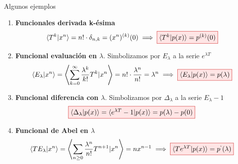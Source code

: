 \documentclass{beamer}
\newcommand{\rboxed}[1]{%
  \fcolorbox{red!80!black}{red!10}{$#1$}%
}
\begin{document}
  \begin{frame}{Algunos ejemplos}
    \begin{enumerate}
      \item \textbf{Funcionales derivada k-ésima}
      \begin{align*}
        \langle T^k| x^n \rangle = n! \cdot \delta_{n,k} = (x^n)^{(k)}(0) \implies
          \rboxed{\langle T^k| p(x) \rangle = p^{(k)}(0)}
      \end{align*}
      \item \textbf{Funcional evaluación en $\lambda$}. Simbolizamos por $E_{\lambda}$ a la serie  $e^{\lambda T}$
      \begin{align*}
        \langle E_{\lambda} | x^n \rangle = \left\langle \sum_{k = 0}^\infty \frac{\lambda^k}{k!}T^k | x^n \right\rangle = n! \cdot \frac{\lambda^n}{n!} = \lambda^n \implies \rboxed{\langle E_{\lambda} | p(x) \rangle = p(\lambda)}
      \end{align*}
      \item \textbf{Funcional diferencia con $\lambda$}. Simbolizamos por $\Delta_{\lambda}$ a la serie $E_{\lambda} - 1$
      \begin{align*}
        \rboxed{\langle \Delta_{\lambda} | p(x) \rangle = \langle e^{\lambda T}-1 | p(x) \rangle = p(\lambda)-p(0)} 
      \end{align*}
      \item \textbf{Funcional de Abel en $\lambda$}
      \begin{align*}
        \langle T E_\lambda | x^n \rangle = \left\langle \sum_{n\geq0} \frac{\lambda^n}{n!}T^{n+1} | x^n \right\rangle = nx^{n-1} \implies \rboxed{\langle Te^{\lambda T} | p(x) \rangle = p^`(\lambda)}
      \end{align*}
    \end{enumerate}
  \end{frame}
\end{document}
